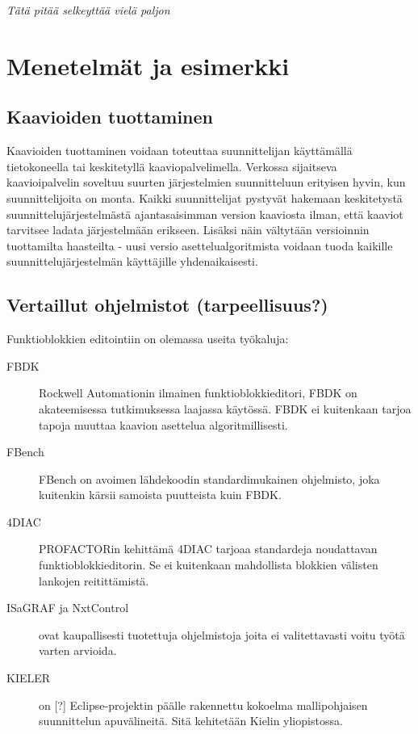 \documentclass[finnish,12pt]{article}
\begin{document}
\emph{Tätä pitää selkeyttää vielä paljon}


	\clearpage
	\section{Menetelmät ja esimerkki}

		\subsection{Kaavioiden tuottaminen}

Kaavioiden tuottaminen voidaan toteuttaa suunnittelijan käyttämällä tietokoneella tai keskitetyllä kaaviopalvelimella.
Verkossa sijaitseva kaavioipalvelin soveltuu suurten järjestelmien suunnitteluun erityisen hyvin, kun suunnittelijoita on monta. Kaikki suunnittelijat pystyvät hakemaan keskitetystä suunnittelujärjestelmästä ajantasaisimman version kaaviosta ilman, että kaaviot tarvitsee ladata järjestelmään erikseen.
Lisäksi näin vältytään versioinnin tuottamilta haasteilta - uusi versio asettelualgoritmista voidaan tuoda kaikille suunnittelujärjestelmän käyttäjille yhdenaikaisesti.

		\subsection{Vertaillut ohjelmistot (tarpeellisuus?) }

Funktioblokkien editointiin on olemassa useita työkaluja:

\begin{description}
	\item[FBDK] Rockwell Automationin ilmainen funktioblokkieditori, FBDK on akateemisessa tutkimuksessa laajassa käytössä. FBDK ei kuitenkaan tarjoa tapoja muuttaa kaavion asettelua algoritmillisesti.
	\item[FBench] FBench on avoimen lähdekoodin standardimukainen ohjelmisto, joka kuitenkin kärsii samoista puutteista kuin FBDK.
	\item[4DIAC] PROFACTORin kehittämä 4DIAC tarjoaa standardeja noudattavan funktioblokkieditorin. Se ei kuitenkaan mahdollista blokkien välisten lankojen reitittämistä. 
	\item[ISaGRAF ja NxtControl] ovat kaupallisesti tuotettuja ohjelmistoja joita ei valitettavasti voitu työtä varten arvioida.
	\item[KIELER] on [?] Eclipse-projektin päälle rakennettu kokoelma mallipohjaisen suunnittelun apuvälineitä. Sitä kehitetään Kielin yliopistossa.
\end{description}
\end{document}
